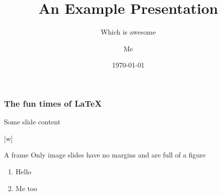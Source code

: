 \documentclass[xcolor={table}]{beamer}
\title{An Example Presentation}
\institute{3Basdjgf}
\subtitle{Which is awesome}
\author{Me}
\date{\today}
\begin{document}
\titleslide

\begin{frame}
  \frametitle{The fun times of \LaTeX}
  Some slide content

\end{frame}

[w]


\begin{frame}{A frame}
Only image slides have no margins and are full of a figure


\begin{enumerate}
  \item Hello
  \item Me too
\end{enumerate}

 \end{frame}
\end{document}
